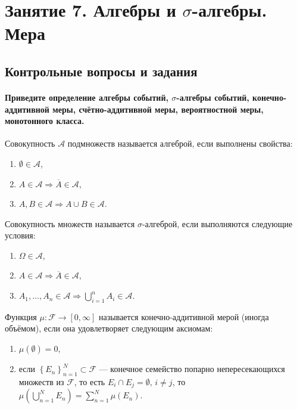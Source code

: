 \chapter*{Занятие 7. Алгебры и $ \sigma $-алгебры. Мера}

\section*{Контрольные вопросы и задания}

\subsubsection*{Приведите определение алгебры событий,
$ \sigma $-алгебры событий, конечно-аддитивной меры, счётно-аддитивной меры, вероятностной меры, монотонного класса.}

Совокупность $\mathcal{A}$ подмножеств называется алгеброй, если выполнены свойства:
\begin{enumerate}
\item $ \emptyset \in \mathcal{A}$,
\item $A \in \mathcal{A} \Rightarrow \overline{A} \in \mathcal{A}$,
\item $A, B \in \mathcal{A} \Rightarrow A \cup B \in \mathcal{A}$.
\end{enumerate}

Совокупность множеств называется $ \sigma $-алгеброй, если выполняются следующие условия:
\begin{enumerate}
\item $ \Omega \in \mathcal{A}$,
\item $A \in \mathcal{A} \Rightarrow \overline{A} \in \mathcal{A}$,
\item $A_1, \dotsc, A_n \in \mathcal{A} \Rightarrow \bigcup \limits_{i=1}^n A_i \in \mathcal{A}$.
\end{enumerate}

Функция $ \mu: \mathcal{F} \rightarrow \left[ 0, \infty \right] $ называется конечно-аддитивной мерой (иногда объёмом), если она удовлетворяет следующим аксиомам:
\begin{enumerate}
\item $ \mu \left( \emptyset \right) = 0$,
\item если
$ \left\{ E_n \right\}_{n=1}^N \subset \mathcal{F}$
--- конечное семейство попарно непересекающихся множеств из
$ \mathcal{F}$, то есть $E_i \cap E_j = \emptyset, \, i \neq j$,
то $ \mu \left( \bigcup \limits_{n=1}^N E_n \right) = \sum \limits_{n=1}^N \mu \left( E_n \right)$.
\end{enumerate}

